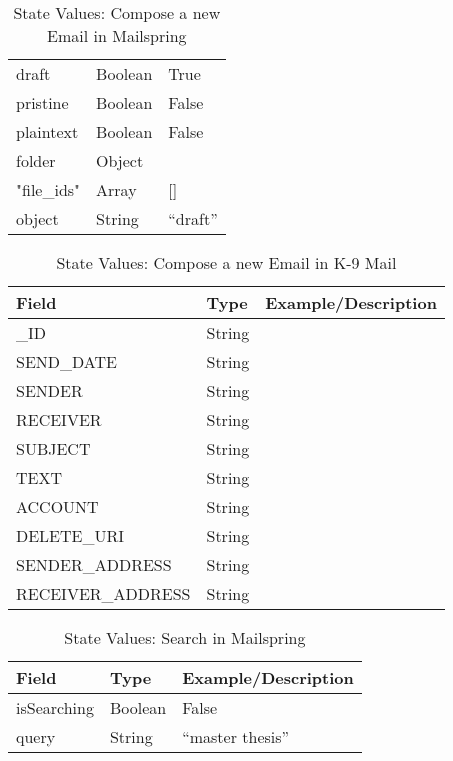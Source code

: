 \begin{table}[H]
\begin{tabular}{lll}
draft     & Boolean   & True                                                   \\
pristine  & Boolean   & False                                                  \\
plaintext & Boolean   & False                                                  \\
folder    & Object    & {}                                                     \\
"file\_ids"  & Array  & []                                                  \\
object    & String    & “draft”                                               
\end{tabular}
\caption{State Values: Compose a new Email in Mailspring}
\label{tab:compose_new_email_mailspring}
\end{table} \FloatBarrier



\FloatBarrier \begin{table}[H]
\centering
\begin{tabular}{lll}
Field     & Type      & Example/Description \\
\hline
\_ID            & String &  \\
SEND\_DATE      & String     &                     \\
SENDER         &  String    &                     \\
RECEIVER         &  String    &                     \\
SUBJECT        &  String    &                     \\
TEXT        &  String    &                     \\
ACCOUNT        &   String   &                     \\
DELETE\_URI     &  String    &                     \\
SENDER\_ADDRESS &   String   &                    \\
RECEIVER\_ADDRESS &   String   &                    
\end{tabular}
\caption{State Values: Compose a new Email in K-9 Mail}
\label{tab:compose_new_email_k9}
\centering
\end{table} \FloatBarrier



\FloatBarrier \begin{table}[H]
\centering
\begin{tabular}{lll}
Field       & Type    & Example/Description \\
\hline
isSearching & Boolean & False               \\
query       & String  & “master   thesis”  
\end{tabular}
\caption{State Values: Search in Mailspring}
\label{tab:search_mailspring}
\end{table} \FloatBarrier



